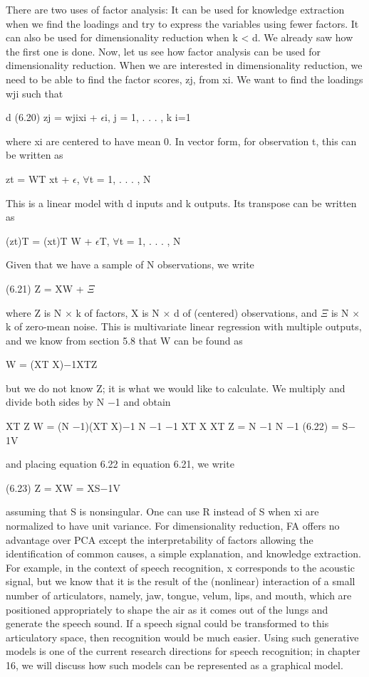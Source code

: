 There are two uses of factor analysis: It can be used for knowledge extraction when we find the loadings and try to express the variables using fewer factors. It can also be used for dimensionality reduction when k < d. We already saw how the first one is done. Now, let us see how factor analysis can be used for dimensionality reduction. When we are interested in dimensionality reduction, we need to be able to find the factor scores, zj, from xi. We want to find the loadings wji such that

d (6.20) zj = wjixi + $\epsilon$i, j = 1, . . . , k i=1

where xi are centered to have mean 0. In vector form, for observation t, this can be written as

zt = WT xt + $\epsilon$, $\forall$t = 1, . . . , N

This is a linear model with d inputs and k outputs. Its transpose can be written as

(zt)T = (xt)T W + $\epsilon$T, $\forall$t = 1, . . . , N

Given that we have a sample of N observations, we write

(6.21) Z = XW + $\Xi$

where Z is N $\times$ k of factors, X is N $\times$ d of (centered) observations, and $\Xi$ is N $\times$ k of zero-mean noise. This is multivariate linear regression with multiple outputs, and we know from section 5.8 that W can be found as

W = (XT X)$-$1XTZ

but we do not know Z; it is what we would like to calculate. We multiply and divide both sides by N $-$1 and obtain

XT Z W = (N $-$1)(XT X)$-$1 N $-$1 $-$1 XT X XT Z = N $-$1 N $-$1 (6.22) = S$-$1V

and placing equation 6.22 in equation 6.21, we write

(6.23) Z = XW = XS$-$1V

assuming that S is nonsingular. One can use R instead of S when xi are normalized to have unit variance. For dimensionality reduction, FA offers no advantage over PCA except the interpretability of factors allowing the identification of common causes, a simple explanation, and knowledge extraction. For example, in the context of speech recognition, x corresponds to the acoustic signal, but we know that it is the result of the (nonlinear) interaction of a small number of articulators, namely, jaw, tongue, velum, lips, and mouth, which are positioned appropriately to shape the air as it comes out of the lungs and generate the speech sound. If a speech signal could be transformed to this articulatory space, then recognition would be much easier. Using such generative models is one of the current research directions for speech recognition; in chapter 16, we will discuss how such models can be represented as a graphical model.

